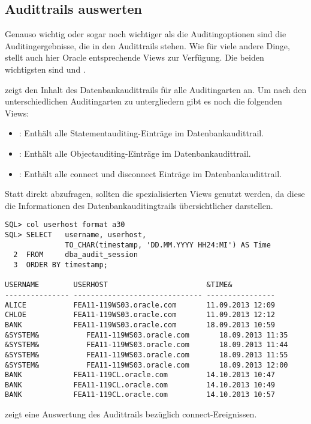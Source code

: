       \subsection{Audittrails auswerten}
        Genauso wichtig oder sogar noch wichtiger als die Auditingoptionen sind die Auditingergebnisse, die in den Audittrails stehen. Wie für viele andere Dinge, stellt auch hier Oracle entsprechende Views zur Verfügung. Die beiden wichtigsten sind  und .

         zeigt den Inhalt des Datenbank\-audittrails für alle Auditingarten an. Um nach den unterschiedlichen Auditingarten zu untergliedern gibt es noch die folgenden Views:
        \begin{itemize}
          \item {}: Enthält alle Statementauditing-Einträge im Datenbank\-audit\-trail.
          \item {}: Enthält alle Objectauditing-Einträge im Datenbank\-audit\-trail.
          \item {}: Enthält alle connect und disconnect Einträge im Datenbank\-audit\-trail.
        \end{itemize}
\clearpage
        \begin{merke}
          Statt  direkt abzufragen, sollten die spezialisierten Views genutzt werden, da diese die Informationen des Datenbankauditingtrails übersichtlicher darstellen.
        \end{merke}
        \begin{lstlisting}[caption={Den Datenbankauditingtrail nach connects auswerten},label=admin815,language=oracle_sql,alsolanguage=sqlplus]
SQL> col userhost format a30
SQL> SELECT   username, userhost,
              TO_CHAR(timestamp, 'DD.MM.YYYY HH24:MI') AS Time
  2  FROM     dba_audit_session
  3  ORDER BY timestamp;

USERNAME        USERHOST                       &TIME&
--------------- ------------------------------ ----------------
ALICE           FEA11-119WS03.oracle.com       11.09.2013 12:09
CHLOE           FEA11-119WS03.oracle.com       11.09.2013 12:12
BANK            FEA11-119WS03.oracle.com       18.09.2013 10:59
&SYSTEM&           FEA11-119WS03.oracle.com       18.09.2013 11:35
&SYSTEM&           FEA11-119WS03.oracle.com       18.09.2013 11:44
&SYSTEM&           FEA11-119WS03.oracle.com       18.09.2013 11:55
&SYSTEM&           FEA11-119WS03.oracle.com       18.09.2013 12:00
BANK            FEA11-119CL.oracle.com         14.10.2013 10:47
BANK            FEA11-119CL.oracle.com         14.10.2013 10:49
BANK            FEA11-119CL.oracle.com         14.10.2013 10:57
        \end{lstlisting}
         zeigt eine Auswertung des Audittrails bezüglich connect-Ereignissen.


